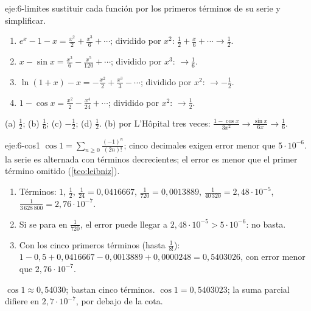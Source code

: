 \begin{solucion}{eje:6-limites}
\planteamiento sustituir cada función por los primeros términos de su serie y simplificar.
\pasos
\begin{enumerate}[label=(\alph*)]
  \item $e^{x}-1-x=\frac{x^{2}}{2}+\frac{x^{3}}{6}+\cdots$; dividido por $x^{2}$: $\frac12+\frac x6+\cdots\to\frac12$.
  \item $x-\sin x=\frac{x^{3}}{6}-\frac{x^{5}}{120}+\cdots$; dividido por $x^{3}$: $\to\frac16$.
  \item $\ln(1+x)-x=-\frac{x^{2}}{2}+\frac{x^{3}}{3}-\cdots$; dividido por $x^{2}$: $\to-\frac12$.
  \item $1-\cos x=\frac{x^{2}}{2}-\frac{x^{4}}{24}+\cdots$; dividido por $x^{2}$: $\to\frac12$.
\end{enumerate}
\resultado (a) $\frac12$; (b) $\frac16$; (c) $-\frac12$; (d) $\frac12$.
\comprobacion (b) por L'Hôpital tres veces: $\frac{1-\cos x}{3x^{2}}\to\frac{\sin x}{6x}\to\frac16$.
\end{solucion}

\begin{solucion}{eje:6-cos1}
\datos $\cos1=\sum_{n\ge0}\frac{(-1)^{n}}{(2n)!}$; cinco decimales exigen error menor que $5\cdot10^{-6}$.
\planteamiento la serie es alternada con términos decrecientes; el error es menor que el primer término omitido (\cref{teo:leibniz}).
\pasos
\begin{enumerate}[label=\arabic*.]
  \item Términos: $1$, $\frac12$, $\frac{1}{24}=0{,}0416667$, $\frac{1}{720}=0{,}0013889$, $\frac{1}{40\,320}=2{,}48\cdot10^{-5}$, $\frac{1}{3\,628\,800}=2{,}76\cdot10^{-7}$.
  \item Si se para en $\frac{1}{720}$, el error puede llegar a $2{,}48\cdot10^{-5}>5\cdot10^{-6}$: no basta.
  \item Con los cinco primeros términos (hasta $\frac{1}{8!}$): $1-0{,}5+0{,}0416667-0{,}0013889+0{,}0000248=0{,}5403026$, con error menor que $2{,}76\cdot10^{-7}$.
\end{enumerate}
\resultado $\cos1\approx0{,}54030$; bastan cinco términos.
\comprobacion $\cos1=0{,}5403023$; la suma parcial difiere en $2{,}7\cdot10^{-7}$, por debajo de la cota.
\end{solucion}

